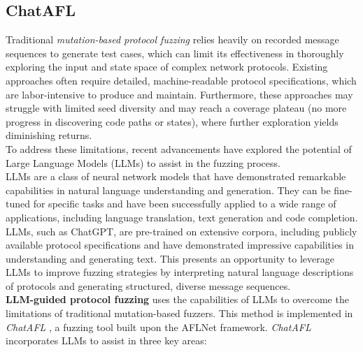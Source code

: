 \subsection{ChatAFL}
Traditional \textit{mutation-based protocol fuzzing} relies heavily on recorded message sequences to generate test cases, which can limit its effectiveness in thoroughly exploring the input and state space of complex network protocols. Existing approaches often require detailed, machine-readable protocol specifications, which are labor-intensive to produce and maintain. Furthermore, these approaches may struggle with limited seed diversity and may reach a coverage plateau (no more progress in discovering code paths or states), where further exploration yields diminishing returns.
\\To address these limitations, recent advancements have explored the potential of Large Language Models (LLMs) to assist in the fuzzing process.
\\LLMs are a class of neural network models that have demonstrated remarkable capabilities in natural language understanding and generation. They can be fine-tuned for specific tasks and have been successfully applied to a wide range of applications, including language translation, text generation and code completion.
\\LLMs, such as ChatGPT, are pre-trained on extensive corpora, including publicly available protocol specifications and have demonstrated impressive capabilities in understanding and generating text. This presents an opportunity to leverage LLMs to improve fuzzing strategies by interpreting natural language descriptions of protocols and generating structured, diverse message sequences.
\\\textbf{LLM-guided protocol fuzzing} uses the capabilities of LLMs to overcome the limitations of traditional mutation-based fuzzers. This method is implemented in \textit{ChatAFL} \cite{chatafl} , a fuzzing tool built upon the AFLNet framework. \textit{ChatAFL} incorporates LLMs to assist in three key areas:

